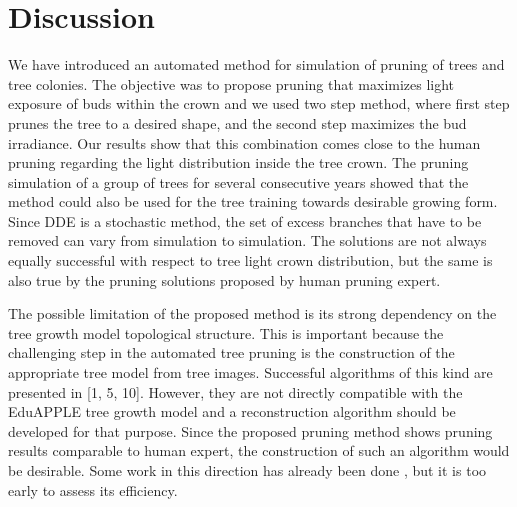 \section{Discussion}

We have introduced an automated method for simulation of pruning of
trees and tree colonies. The objective was to propose pruning that
maximizes light exposure of buds within the crown and we used two step
method, where first step prunes the tree to a desired shape, and the
second step maximizes the bud irradiance. Our results show that this
combination comes close to the human pruning regarding the light
distribution inside the tree crown. The pruning simulation of a group of
trees for several consecutive years showed that the method could also be
used for the tree training towards desirable growing form. Since DDE is
a stochastic method, the set of excess branches that have to be removed
can vary from simulation to simulation. The solutions are not always
equally successful with respect to tree light crown distribution, but
the same is also true by the pruning solutions proposed by human pruning
expert.

The possible limitation of the proposed method is its strong dependency
on the tree growth model topological structure. This is important
because the challenging step in the automated tree pruning is the
construction of the appropriate tree model from tree images. Successful
algorithms of this kind are presented in {[}1, 5, 10{]}. However, they
are not directly compatible with the EduAPPLE tree growth model and a
reconstruction algorithm should be developed for that purpose. Since the
proposed pruning method shows pruning results comparable to human
expert, the construction of such an algorithm would be desirable. Some
work in this direction has already been done \cite{kohek_estimation_2017}, but it is too
early to assess its efficiency.

